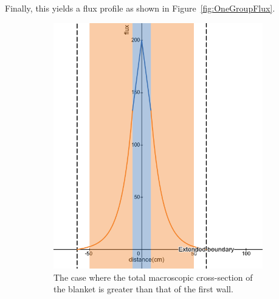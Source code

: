\documentclass[a4paper, 12pt]{article}
\begin{document}
Finally, this yields a flux profile as shown in Figure~\ref{fig:OneGroupFlux}.
\begin{figure}
  \begin{subfigure}[b]{0.4\textwidth}
    \includegraphics[width=\textwidth]{OneGroupFluxBlanketAbs.png}
    \caption{The case where the total macroscopic cross-section of the blanket is greater than that of the first wall.}
    \label{fig:OneGroupFluxBlanketAbs}
  \end{subfigure}
  \hfill
  \begin{subfigure}[b]{0.4\textwidth}

\end{subfigure}
\end{figure}
\end{document}
